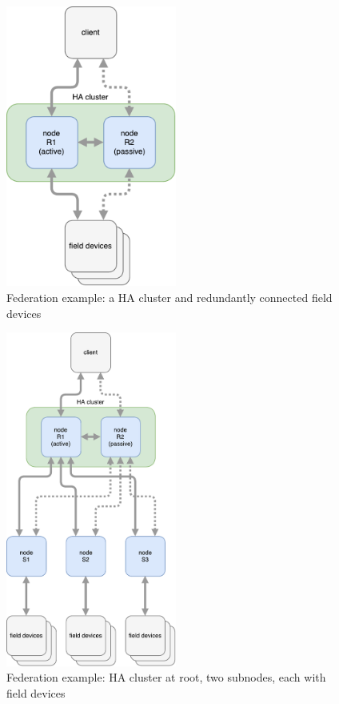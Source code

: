 \begin{figure}[]
	\center
	\includegraphics[width=0.5\textwidth]{img/topo_sl_ha.pdf}
	\caption{Federation example: a HA cluster and redundantly connected field devices}
	\label{fig:topo:sl:ha}
\end{figure}
\begin{figure}[]
	\center
	\includegraphics[width=0.5\textwidth]{img/topo_ml_ha.pdf}
	\caption{Federation example: HA cluster at root, two subnodes, each with field devices}
	\label{fig:topo:ml:ha}
\end{figure}

